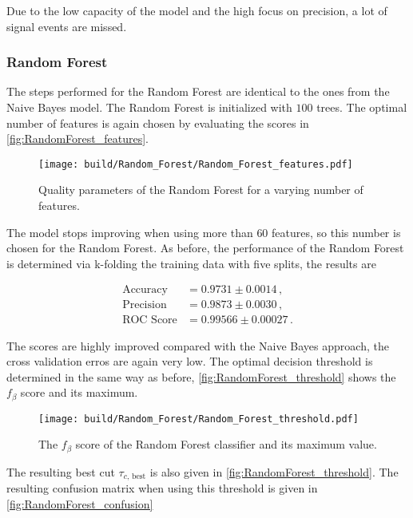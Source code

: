 Due to the low capacity of the model and the high focus on precision, a lot of signal events are missed.

\subsubsection{Random Forest}

The steps performed for the Random Forest are identical to the ones from the Naive Bayes model.
The Random Forest is initialized with $100$ trees.
The optimal number of features is again chosen by evaluating the scores in
\autoref{fig:RandomForest_features}.

\begin{figure}[H]
  \centering
  \texttt{[image: build/Random\_Forest/Random\_Forest\_features.pdf]}
  \caption{Quality parameters of the Random Forest for a varying number of features.}
  \label{fig:RandomForest_features}
\end{figure}

The model stops improving when using more than $60$ features, so this number is chosen for the Random Forest.
As before, the performance of the Random Forest is determined via k-folding the training data
with five splits, the results are

\begin{align*}
  \text{Accuracy} &= 0.9731\pm0.0014 \,, \\
  \text{Precision} &= 0.9873\pm0.0030 \,, \\
  \text{ROC Score} &= 0.99566\pm0.00027 \,.
\end{align*}

The scores are highly improved compared with the Naive Bayes approach, the cross validation erros are again very low.
The optimal decision threshold is determined in the same way as before, \autoref{fig:RandomForest_threshold}
shows the $f_\beta$ score and its maximum.

\begin{figure}[H]
  \centering
  \texttt{[image: build/Random\_Forest/Random\_Forest\_threshold.pdf]}
  \caption{The $f_\beta$ score of the Random Forest classifier and its maximum value.}
  \label{fig:RandomForest_threshold}
\end{figure}

The resulting best cut $\tau_{c \text{, best}}$ is also given in \autoref{fig:RandomForest_threshold}. The resulting confusion matrix 
when using this threshold is given in \autoref{fig:RandomForest_confusion}

